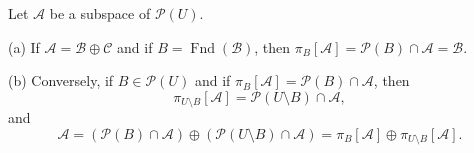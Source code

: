 Let $\mathcal{A}$ be a subspace of $\mathcal{P}(U)$.

(a) If $\mathcal{A} = \mathcal{B} \oplus \mathcal{C}$ and if $B = \operatorname{Fnd}(\mathcal{B})$, then $\pi_B[\mathcal{A}] = \mathcal{P}(B) \cap \mathcal{A} = \mathcal{B}$.

(b) Conversely, if $B \in \mathcal{P}(U)$ and if $\pi_B[\mathcal{A}] = \mathcal{P}(B) \cap \mathcal{A}$, then
$$\pi_{U \setminus B}[\mathcal{A}] = \mathcal{P}(U \setminus B) \cap \mathcal{A},$$
and
$$\mathcal{A} = (\mathcal{P}(B) \cap \mathcal{A}) \oplus (\mathcal{P}(U \setminus B) \cap \mathcal{A}) = \pi_B[\mathcal{A}] \oplus \pi_{U \setminus B}[\mathcal{A}].$$
